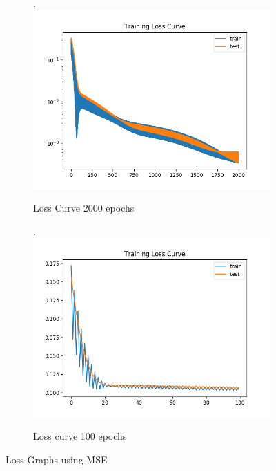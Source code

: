 \begin{figure}[h]
    \begin{subfigure}{.5\linewidth}.
        \centering
    	\includegraphics[width=\linewidth]{lstm/loss_f.png}
        \caption{Loss Curve 2000 epochs}
    \end{subfigure}
    \begin{subfigure}{.5\linewidth}.
        \centering
    	\includegraphics[width=\linewidth]{lstm/loss_2.png}
        \caption{Loss curve 100 epochs}
    \end{subfigure}\par\medskip
    \caption{Loss Graphs using MSE}
	\label{fig:loss}
\end{figure}

